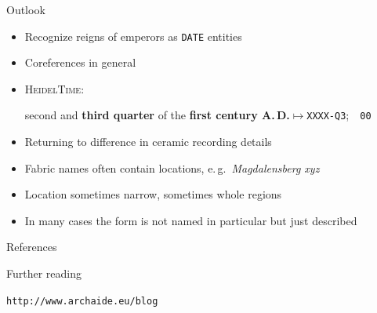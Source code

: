 \documentclass[xcolor=x11names, aspectratio=169,usenames,dvipsnames]{beamer}
\begin{document}
\begin{frame}{Outlook}
\begin{itemize}
\item Recognize reigns of emperors as \texttt{DATE} entities
\item Coreferences in general
\item \textsc{HeidelTime}:

second and \textbf{third quarter} of the \textbf{first century A.\,D.}\quad$\longmapsto$\quad\texttt{XXXX-Q3};~~\texttt{00}
\item Returning to difference in ceramic recording details
\item Fabric names often contain locations, e.\,g.\ \emph{Magdalensberg xyz}
\item Location sometimes narrow, sometimes whole regions
\item In many cases the form is not named in particular but just described
\end{itemize}
\end{frame}

\begin{frame}{References}
\nocite{*}
\printbibliography[heading=none]
\end{frame}

\begin{frame}{Further reading}
\begin{center}
\Large\noindent\texttt{http://www.archaide.eu/blog}
\end{center}
\end{frame}
\end{document}
